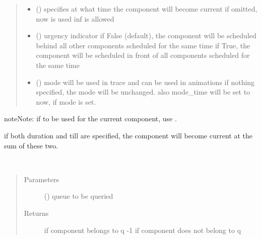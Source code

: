 \documentclass[letterpaper,10pt,english]{sphinxmanual}
\begin{document}
\begin{fulllineitems}
\begin{fulllineitems}
\begin{quote}
\begin{description}
\begin{itemize}
\item {} 
 () \textendash{} specifies at what time the component will become current 
if omitted, now is used 
inf is allowed

\item {} 
 () \textendash{} urgency indicator 
if False (default), the component will be scheduled
behind all other components scheduled
for the same time 
if True, the component will be scheduled
in front of all components scheduled
for the same time

\item {} 
 () \textendash{} mode 
will be used in trace and can be used in animations 
if nothing specified, the mode will be unchanged. 
also mode\_time will be set to now, if mode is set.

\end{itemize}

\end{description}\end{quote}

\begin{sphinxadmonition}{note}{Note:}
if to be used for the current component, use . 

if both duration and till are specified, the component will become current at the sum of
these two.
\end{sphinxadmonition}

\end{fulllineitems}


\begin{fulllineitems}
\label{\detokenize{Reference:salabim.Component.index}}~\begin{quote}\begin{description}
\item[{Parameters}] \leavevmode
{} ({\hyperref[\detokenize{Reference:salabim.Queue}]{}}) \textendash{} queue to be queried

\item[{Returns}] \leavevmode
{} \textendash{} if component belongs to q 
-1 if component does not belong to q


\end{description}
\end{quote}
\end{fulllineitems}
\end{fulllineitems}
\end{document}
